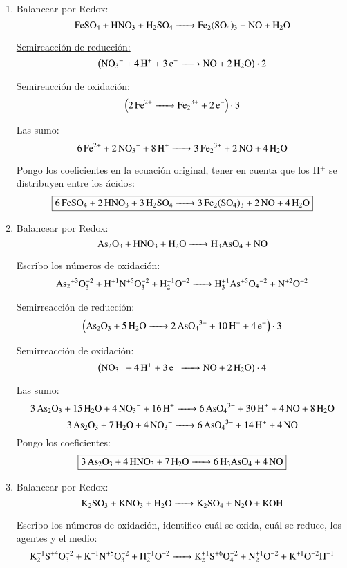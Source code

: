 \begin{enumerate}
\newpage
\item Balancear por Redox:
$$\ce{FeSO4 + HNO3 + H2SO4 -> Fe2(SO4)3 + NO + H2O}$$


\begin{multicols}{2}
\underline{Semireacción de reducción:}
 $$\left(\ce{NO_3^- + 4H^+ + 3e^- -> NO + 2H_2O}\right)\cdot 2$$

\underline{Semireacción de oxidación:}
$$\left(\ce{ 2Fe^{2+} -> Fe_2^{3+} + 2e^-}  \right)\cdot 3$$
\end{multicols}

Las sumo:
$$
\ce{6Fe^{2+} + 2NO_3^- + 8H^+ -> 3Fe_2^{3+} + 2NO + 4H_2O}
$$

Pongo los coeficientes en la ecuación original, tener en cuenta que los H$^+$ se distribuyen entre los ácidos:
$$\fbox{\ce{6FeSO_4 + 2HNO_3 + 3H_2SO_4 -> 3Fe_2(SO4)3 + 2NO + 4H2O}}$$


\item Balancear por Redox:
$$\ce{
As2O3 + HNO3 + H2O -> H3AsO4 + NO
}$$

Escribo los números de oxidación:
$$\ce{
As2^{+3}O^{-2}3 + H^{+1}N^{+5}O^{-2}3 + H^{+1}2O^{-2} -> H^{+1}3As^{+5}O4^{-2} + N^{+2}O^{-2}
}$$


\begin{multicols}{2}
Semirreacción de reducción:
$$\left(\ce{
As2O3 + 5H2O -> 2AsO4^{3-} + 10H^+ +4e^-
}\right)\cdot 3$$

Semirreacción de oxidación:
$$\left(\ce{
NO_3^{-} + 4H^+ +3e^- -> NO + 2H2O
}\right)\cdot 4$$
\end{multicols}

Las sumo:
$$\ce{
3As2O3 + 15H2O + 4NO3^- + 16H^+ -> 6AsO_4^{3-} + 30H^+ + 4NO + 8 H2O
}$$
$$\ce{
3As2O3 + 7H2O + 4NO3^- -> 6AsO_4^{3-} + 14H^+ + 4NO
}$$
Pongo los coeficientes:
$$\fbox{\ce{
3As2O3 + 4HNO3 + 7H2O -> 6H3AsO4 + 4NO}}$$


\newpage
\item
Balancear por Redox:
$$\ce{K2SO3 + KNO3 + H2O ->
K2SO4 + N2O + KOH}$$

Escribo los números de oxidación, identifico cuál se oxida, cuál se reduce, los agentes y el medio:
$$\ce{
K^{+1}2S^{+4}O^{-2}3 + K^{+1}N^{+5}O^{-2}3 + H^{+1}2O^{-2} ->
K^{+1}2S^{+6}O^{-2}4 + N^{+1}2O^{-2} + K^{+1}O^{-2}H^{-1}
}$$



\end{enumerate}
